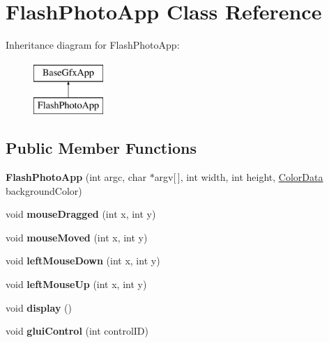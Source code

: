 \hypertarget{classFlashPhotoApp}{\section{Flash\-Photo\-App Class Reference}
\label{classFlashPhotoApp}
}
Inheritance diagram for Flash\-Photo\-App\-:\begin{figure}[H]
\begin{center}
\leavevmode
\includegraphics[height=2.000000cm]{classFlashPhotoApp}
\end{center}
\end{figure}
\subsection*{Public Member Functions}
\begin{DoxyCompactItemize}
\item 
\hypertarget{classFlashPhotoApp_a944931218613603cfb6bda6113971382}{{\bfseries Flash\-Photo\-App} (int argc, char $\ast$argv\mbox{[}$\,$\mbox{]}, int width, int height, \hyperlink{classColorData}{Color\-Data} background\-Color)}\label{classFlashPhotoApp_a944931218613603cfb6bda6113971382}

\item 
\hypertarget{classFlashPhotoApp_a29505b498fac898e099cfd1b8590c91a}{void {\bfseries mouse\-Dragged} (int x, int y)}\label{classFlashPhotoApp_a29505b498fac898e099cfd1b8590c91a}

\item 
\hypertarget{classFlashPhotoApp_acf5a4cc5b76bb676d337758543bfdcc4}{void {\bfseries mouse\-Moved} (int x, int y)}\label{classFlashPhotoApp_acf5a4cc5b76bb676d337758543bfdcc4}

\item 
\hypertarget{classFlashPhotoApp_a2c348ddcc15b6a21972bc6aac98c5442}{void {\bfseries left\-Mouse\-Down} (int x, int y)}\label{classFlashPhotoApp_a2c348ddcc15b6a21972bc6aac98c5442}

\item 
\hypertarget{classFlashPhotoApp_ae3a2f37b7c3657dcb5c16402c6d25519}{void {\bfseries left\-Mouse\-Up} (int x, int y)}\label{classFlashPhotoApp_ae3a2f37b7c3657dcb5c16402c6d25519}

\item 
\hypertarget{classFlashPhotoApp_a5dedc84bbc9ea0cf0718b8d0d0f414a5}{void {\bfseries display} ()}\label{classFlashPhotoApp_a5dedc84bbc9ea0cf0718b8d0d0f414a5}

\item 
\hypertarget{classFlashPhotoApp_aaeea3b8490d0f0239e41b781f6a066aa}{void {\bfseries glui\-Control} (int control\-I\-D)}\label{classFlashPhotoApp_aaeea3b8490d0f0239e41b781f6a066aa}

\end{DoxyCompactItemize}
